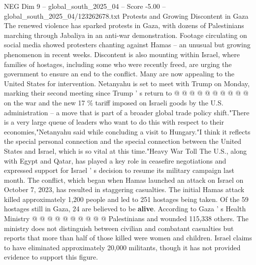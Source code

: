 \begin{textsample}{NEG Dim 9 – global\_south\_2025\_04 – Score -5.00 – global\_south\_2025\_04/123262678.txt}
Protests and Growing Discontent in Gaza The renewed violence has sparked protests in Gaza, with dozens of Palestinians marching through Jabaliya in an anti-war demonstration.
Footage circulating on social media showed protesters chanting against Hamas -- an unusual but growing phenomenon in recent weeks.
Discontent is also mounting within Israel, where families of hostages, including some who were recently freed, are urging the government to ensure an end to the conflict.
Many are now appealing to the United States for intervention.
Netanyahu is set to meet with Trump on Monday, marking their second meeting since Trump ' s return to @ @ @ @ @ @ @ @ @ @ on the war and the new 17 \% tariff imposed on Israeli goods by the U.S. administration -- a move that is part of a broader global trade policy shift."There is a very large queue of leaders who want to do this with respect to their economies,"Netanyahu said while concluding a visit to Hungary."I think it reflects the special personal connection and the special connection between the United States and Israel, which is so vital at this time."Heavy War Toll The U.S., along with Egypt and Qatar, has played a key role in ceasefire negotiations and expressed support for Israel ' s decision to resume its military campaign last month.
The conflict, which began when Hamas launched an attack on Israel on October 7, 2023, has resulted in staggering casualties.
The initial Hamas attack killed approximately 1,200 people and led to 251 hostages being taken.
Of the 59 hostages still in Gaza, 24 are believed to be \textbf{alive}.
According to Gaza ' s Health Ministry @ @ @ @ @ @ @ @ @ @ Palestinians and wounded 115,338 others.
The ministry does not distinguish between civilian and combatant casualties but reports that more than half of those killed were women and children.
Israel claims to have eliminated approximately 20,000 militants, though it has not provided evidence to support this figure.

\end{textsample}
